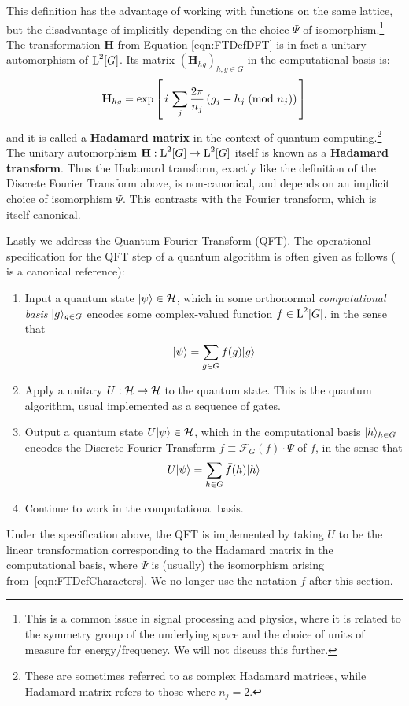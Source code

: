 This definition has the advantage of working with functions on the same lattice, but the disadvantage of implicitly depending on the choice $\Psi$ of isomorphism.\footnote{This is a common issue in signal processing and physics, where it is related to the symmetry group of the underlying space and the choice of units of measure for energy/frequency. We will not discuss this further.} The transformation $\mathbf{H}$ from Equation \ref{eqn:FTDefDFT} is in fact a unitary automorphism of $\operatorname{L}^2[G]$. Its matrix $(\mathbf{H}_{hg})_{h,g \in G}$ in the computational basis is:
\begin{equation} \label{eqn:HadamardMatrixDef}
  \mathbf{H}_{hg} = \exp\left[\, i \, \sum_j \frac{2 \pi}{n_j} \left(\modclass{g_j-h_j}{n_j}\right) \, \right] %
\end{equation}
and it is called a \textbf{Hadamard matrix} in the context of quantum computing.\footnote{These are sometimes referred to as complex Hadamard matrices, while Hadamard matrix refers to those where $n_j=2$.} The unitary automorphism $\mathbf{H}:\operatorname{L}^2[G] \rightarrow \operatorname{L}^2[G]$ itself is known as a \textbf{Hadamard transform}. Thus the Hadamard transform, exactly like the definition of the Discrete Fourier Transform above, is non-canonical, and depends on an implicit choice of isomorphism $\Psi$. This contrasts with the Fourier transform, which is itself canonical.

Lastly we address the Quantum Fourier Transform (QFT). The operational specification for the QFT step of a quantum algorithm is often given as follows (\cite{nielsen2010quantum} is a canonical reference):
\begin{enumerate}
  \item[1.] Input a quantum state $| \psi \rangle \in \mathcal{H}$, which in some orthonormal \textit{computational basis} $| g \rangle_{g\in G}$ encodes some complex-valued function $f \in \operatorname{L}^2[G]$, in the sense that 
    \begin{equation*}
      | \psi \rangle = \sum_{g\in G} f(g) | g \rangle
    \end{equation*}
  \item[2.] Apply a unitary $U : \mathcal{H} \rightarrow \mathcal{H}$ to the quantum state. This is the quantum algorithm, usual implemented as a sequence of gates.
  \item[3.] Output a quantum state $U| \psi \rangle \in \mathcal{H}$, which in the computational basis $| h \rangle_{h\in G}$ encodes the Discrete Fourier Transform $\bar{f} \equiv \mathcal{F}_G(f) \cdot \Psi$ of $f$, in the sense that 
    \begin{equation*}
      U | \psi \rangle = \sum_{h\in G} \bar{f}(h)| h \rangle
    \end{equation*}
  \item[4.] Continue to work in the computational basis.
\end{enumerate}
Under the specification above, the QFT is implemented by taking $U$ to be the linear transformation corresponding to the Hadamard matrix in the computational basis, where $\Psi$ is (usually) the isomorphism arising from~\eqref{eqn:FTDefCharacters}. We no longer use the notation $\bar{f}$ after this section.

